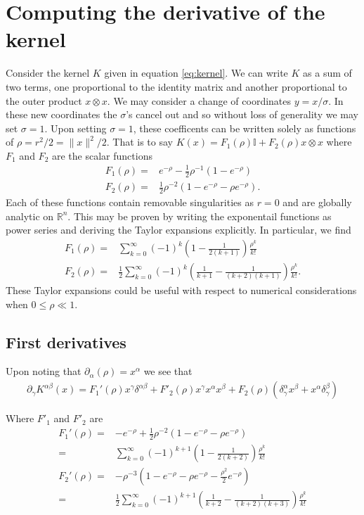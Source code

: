 \documentclass[12pt]{amsart}
\begin{document}
\section{Computing the derivative of the kernel}
\label{sec:computing_derivatives}
Consider the kernel $K$ given in equation \eqref{eq:kernel}.  We can write $K$ as a sum of two terms, one proportional to the identity matrix and another proportional to the outer product $x \otimes x$.  We may consider a change of coordinates $y = x /\sigma$.  In these new coordinates the $\sigma$'s cancel out and so without loss of generality we may set $\sigma = 1$.  Upon setting $\sigma = 1$, these coefficents can be written solely as functions of $\rho = r^2/2 = \| x \|^2 / 2$.  That is to say $K(x) = F_1(\rho) \mathbb{I} + F_2(\rho) x \otimes x$ where $F_1$ and $F_2$ are the scalar functions
\begin{align*}
	F_1(\rho) =&  e^{-\rho} - \frac{1}{2} \rho^{-1} \left( 1 - e^{-\rho} \right) \\
        F_2(\rho) =& \frac{1}{2} \rho^{-2} \left( 1 - e^{-\rho} - \rho e^{-\rho} \right).
\end{align*}
Each of these functions contain removable singularities as $r=0$ and are globally analytic on $\mathbb{R}^n$.  This may be proven by writing the exponentail functions as power series and deriving the Taylor expansions explicitly.  In particular, we find
\begin{align*}
  F_1(\rho) =& \sum_{k=0}^{\infty} (-1)^k \left( 1 - \frac{1}{2(k+1)} \right) \frac{\rho^k}{k!} \\
  F_2(\rho) =& \frac{1}{2} \sum_{k=0}^{\infty} (-1)^{k} \left( \frac{1}{k+1} - \frac{1}{(k+2)(k+1)} \right) \frac{\rho^k}{k!}.
\end{align*}
These Taylor expansions could be useful with respect to numerical considerations when $0 \leq \rho \ll 1$.

\subsection{First derivatives}
Upon noting that $\partial_\alpha( \rho ) = x^\alpha$ we see that
\begin{align*}
  \partial_\gamma K^{\alpha \beta}(x) = F_1'(\rho) x^\gamma \delta^{\alpha \beta} + F'_2(\rho) x^\gamma x^\alpha x^\beta + F_2(\rho) \left( \delta_\gamma^\alpha x^\beta + x^\alpha \delta_\gamma^\beta \right)
\end{align*}

Where $F'_1$ and $F'_2$ are
\begin{align*}
  F_1'(\rho) =& - e^{-\rho} + \frac{1}{2} \rho^{-2} ( 1 - e^{-\rho} - \rho e^{-\rho})\\
  =& \sum_{k=0}^{\infty} (-1)^{k+1} \left( 1 - \frac{1}{2(k+2)} \right) \frac{\rho^k}{k!} \\
  F_2'(\rho) =& - \rho^{-3} \left( 1 - e^{-\rho} - \rho e^{-\rho} - \frac{\rho^2}{2} e^{-\rho} \right) \\
  =& \frac{1}{2} \sum_{k=0}^{\infty} (-1)^{k+1} \left( \frac{1}{k+2} - \frac{1}{(k+2)(k+3)} \right) \frac{\rho^k}{k!}
\end{align*}
\end{document}
